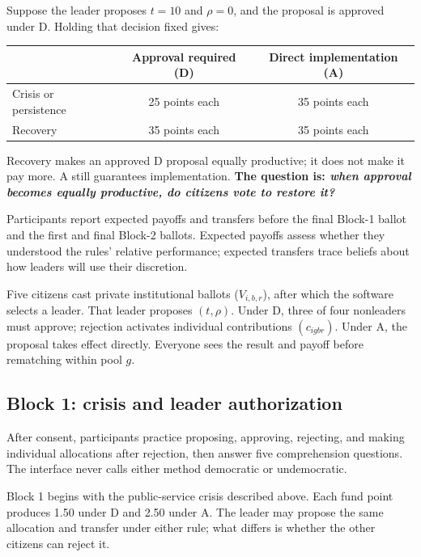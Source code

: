 \documentclass[11pt,a4paper]{article}
\newcommand{\Dproc}{\textsf{D}}
\newcommand{\Aproc}{\textsf{A}}
\begin{document}
\begin{payoffbox}
Suppose the leader proposes $t=10$ and $\rho=0$, and the proposal is approved under \Dproc{}. Holding that decision fixed gives:

\begin{center}
\renewcommand{\arraystretch}{1.15}
\begin{tabular}{lcc}
\toprule
& Approval required (\Dproc) & Direct implementation (\Aproc) \\
\midrule
Crisis or persistence & 25 points each & 35 points each \\
Recovery & 35 points each & 35 points each \\
\bottomrule
\end{tabular}
\end{center}

Recovery makes an approved \Dproc{} proposal equally productive; it does not make it pay more. \Aproc{} still guarantees implementation. {\bf The question is: \emph{when approval becomes equally productive, do citizens vote to restore it?}}
\end{payoffbox}

Participants report expected payoffs and transfers before the final Block-1 ballot and the first and final Block-2 ballots. Expected payoffs assess whether they understood the rules' relative performance; expected transfers trace beliefs about how leaders will use their discretion.


\begin{plainlanguagebox}
Five citizens cast private institutional ballots ($V_{i,b,r}$), after which the software selects a leader. That leader proposes $(t,\rho)$. Under \Dproc{}, three of four nonleaders must approve; rejection activates individual contributions $(c_{igbr})$. Under \Aproc{}, the proposal takes effect directly. Everyone sees the result and payoff before rematching within pool $g$.
\end{plainlanguagebox}

\subsection{Block 1: crisis and leader authorization}

After consent, participants practice proposing, approving, rejecting, and making individual allocations after rejection, then answer five comprehension questions. The interface never calls either method democratic or undemocratic.

Block 1 begins with the public-service crisis described above. Each fund point produces 1.50 under \Dproc{} and 2.50 under \Aproc{}. The leader may propose the same allocation and transfer under either rule; what differs is whether the other citizens can reject it.
\end{document}

